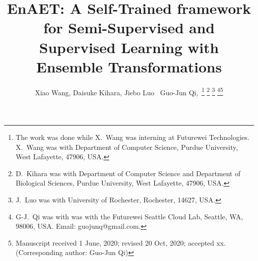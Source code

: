 \documentclass[journal]{IEEEtran}
\begin{document}
\title{EnAET: A Self-Trained framework for Semi-Supervised and Supervised Learning with Ensemble Transformations}


\author{Xiao Wang, Daisuke Kihara, Jiebo Luo~
         Guo-Jun Qi,~\thanks{The work was done while X.~Wang was interning at Futurewei Technologies. X.~Wang was with Department of Computer Science, Purdue University, West Lafayette, 47906, USA.}
\thanks{D.~Kihara was with Department of Computer Science and Department of Biological Sciences, Purdue University, West Lafayette, 47906, USA. }
\thanks{J.~Luo was with University of Rochester, Rochester, 14627, USA.}
\thanks{G-J.~Qi was with was with the Futurewei Seattle Cloud Lab, Seattle, WA, 98006, USA. Email: guojunq@gmail.com.}\thanks{Manuscript received 1 June, 2020; revised 20 Oct, 2020; accepted xx. (Corresponding author: Guo-Jun Qi)}
}


















\maketitle
\end{document}
